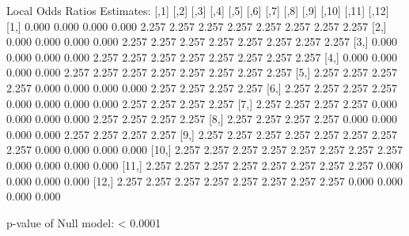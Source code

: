 \documentclass[
]{jss}
\begin{document}
\begin{CodeChunk}
\begin{CodeOutput}
Local Odds Ratios Estimates:
       [,1]  [,2]  [,3]  [,4]  [,5]  [,6]  [,7]  [,8]  [,9] [,10] [,11] [,12]
 [1,] 0.000 0.000 0.000 0.000 2.257 2.257 2.257 2.257 2.257 2.257 2.257 2.257
 [2,] 0.000 0.000 0.000 0.000 2.257 2.257 2.257 2.257 2.257 2.257 2.257 2.257
 [3,] 0.000 0.000 0.000 0.000 2.257 2.257 2.257 2.257 2.257 2.257 2.257 2.257
 [4,] 0.000 0.000 0.000 0.000 2.257 2.257 2.257 2.257 2.257 2.257 2.257 2.257
 [5,] 2.257 2.257 2.257 2.257 0.000 0.000 0.000 0.000 2.257 2.257 2.257 2.257
 [6,] 2.257 2.257 2.257 2.257 0.000 0.000 0.000 0.000 2.257 2.257 2.257 2.257
 [7,] 2.257 2.257 2.257 2.257 0.000 0.000 0.000 0.000 2.257 2.257 2.257 2.257
 [8,] 2.257 2.257 2.257 2.257 0.000 0.000 0.000 0.000 2.257 2.257 2.257 2.257
 [9,] 2.257 2.257 2.257 2.257 2.257 2.257 2.257 2.257 0.000 0.000 0.000 0.000
[10,] 2.257 2.257 2.257 2.257 2.257 2.257 2.257 2.257 0.000 0.000 0.000 0.000
[11,] 2.257 2.257 2.257 2.257 2.257 2.257 2.257 2.257 0.000 0.000 0.000 0.000
[12,] 2.257 2.257 2.257 2.257 2.257 2.257 2.257 2.257 0.000 0.000 0.000 0.000

p-value of Null model: < 0.0001 
\end{CodeOutput}
\end{CodeChunk}
\end{document}
